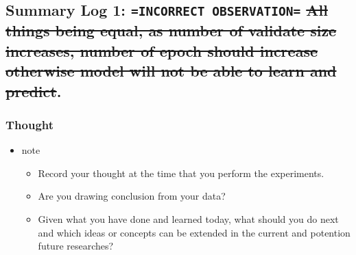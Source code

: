 \documentclass[11pt]{article}
\begin{document}
\subsection{Summary Log 1: \texttt{=INCORRECT OBSERVATION=} \sout{All things being equal, as number of validate size increases, number of epoch should increase otherwise model will not be able to learn and predict}.}
\label{sec:org56d1782}
\subsubsection{Thought}
\label{sec:orgf87b4d9}
\begin{itemize}
\item note
\begin{itemize}
\item Record your thought at the time that you perform the experiments.
\item Are you drawing conclusion from your data?
\item Given what you have done and learned today, what should you do next and which ideas or concepts can be extended in the current and potention future researches?
\end{itemize}
\end{itemize}
\end{document}
